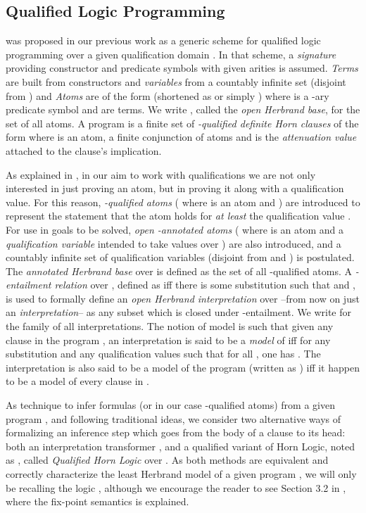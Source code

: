 \documentclass{sigplanconf}
\theoremstyle{definition}
\theoremstyle{plain}
\begin{document}
\subsection{Qualified Logic Programming} \label{QLP}

 was proposed in our previous work \cite{RR08} as a generic scheme for qualified logic programming over a given qualification domain . In that scheme, a \emph{signature}  providing constructor and predicate symbols with given arities is assumed. \emph{Terms} are built from constructors and \emph{variables} from a countably infinite set  (disjoint from )  and \emph{Atoms} are of the form  (shortened as  or simply ) where  is a -ary predicate symbol and  are terms. We write , called the \emph{open Herbrand base}, for the set of all atoms. A  program  is a finite set of \emph{-qualified definite Horn clauses} of the form  where  is an atom,  a finite conjunction of atoms and  is the \emph{attenuation value} attached to the clause's implication.

As explained in  \cite{RR08}, in our aim to work with qualifications we are not only interested in just proving an atom, but in proving it along with a qualification value. For this reason, \emph{-qualified atoms} ( where  is an atom and ) are introduced to represent the statement that the atom  holds for \emph{at least} the qualification value . For use in goals to be solved, \emph{open -annotated atoms} ( where  is an atom and  a \emph{qualification variable} intended to take values over ) are also introduced, and a countably infinite set  of qualification variables (disjoint from  and ) is postulated. The \emph{annotated Herbrand base} over  is defined as the set  of all -qualified atoms. A \emph{-entailment relation} over , defined as  iff there is some substitution  such that  and , is used to formally define an \emph{open Herbrand interpretation} over  --from now on just an \emph{interpretation}-- as any subset  which is closed under -entailment. We write  for the family of all interpretations. The notion of model is such that given any clause  in the  program , an interpretation  is said to be a \emph{model} of  iff for any substitution  and any qualification values  such that  for all , one has . The interpretation  is also said to be a model of the  program  (written as ) iff it happen to be a model of every clause in .

As technique to infer formulas (or in our case -qualified atoms) from a given  program , and following traditional ideas, we consider two alternative ways of formalizing an inference step which goes from the body of a clause to its head: both an interpretation transformer , and a qualified variant of Horn Logic, noted as , called \emph{Qualified Horn Logic} over . As both methods are equivalent and correctly characterize the least Herbrand model of a given program , we will only be recalling the logic , although we encourage the reader to see Section 3.2 in \cite{RR08}, where the fix-point semantics is explained.
\end{document}
